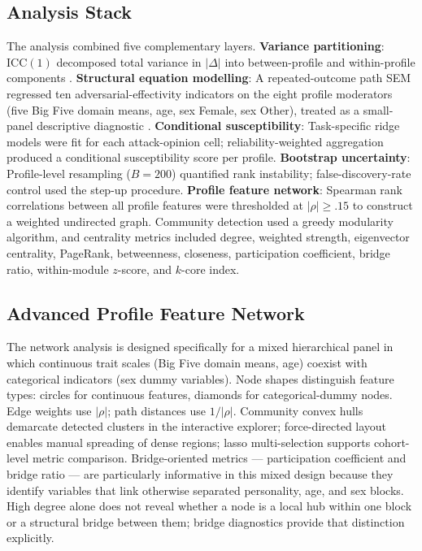 \documentclass[11pt,a4paper]{article}
\begin{document}
\subsection{Analysis Stack}

The analysis combined five complementary layers. \textbf{Variance partitioning}: $\mathrm{ICC}(1)$ decomposed total variance in $|\Delta|$ into between-profile and within-profile components \citep{shrout1979intraclass}. \textbf{Structural equation modelling}: A repeated-outcome path SEM regressed ten adversarial-effectivity indicators on the eight profile moderators (five Big Five domain means, age, sex Female, sex Other), treated as a small-panel descriptive diagnostic \citep{rosseel2012lavaan}. \textbf{Conditional susceptibility}: Task-specific ridge models were fit for each attack-opinion cell; reliability-weighted aggregation produced a conditional susceptibility score per profile. \textbf{Bootstrap uncertainty}: Profile-level resampling ($B = 200$) quantified rank instability; false-discovery-rate control used the \citet{benjamini1995controlling} step-up procedure. \textbf{Profile feature network}: Spearman rank correlations between all profile features were thresholded at $|\rho| \ge .15$ to construct a weighted undirected graph. Community detection used a greedy modularity algorithm, and centrality metrics included degree, weighted strength, eigenvector centrality, PageRank, betweenness, closeness, participation coefficient, bridge ratio, within-module $z$-score, and $k$-core index.

\subsection{Advanced Profile Feature Network}

The network analysis is designed specifically for a mixed hierarchical panel in which continuous trait scales (Big Five domain means, age) coexist with categorical indicators (sex dummy variables). Node shapes distinguish feature types: circles for continuous features, diamonds for categorical-dummy nodes. Edge weights use $|\rho|$; path distances use $1/|\rho|$. Community convex hulls demarcate detected clusters in the interactive explorer; force-directed layout enables manual spreading of dense regions; lasso multi-selection supports cohort-level metric comparison. Bridge-oriented metrics — participation coefficient and bridge ratio — are particularly informative in this mixed design because they identify variables that link otherwise separated personality, age, and sex blocks. High degree alone does not reveal whether a node is a local hub within one block or a structural bridge between them; bridge diagnostics provide that distinction explicitly.
\end{document}
